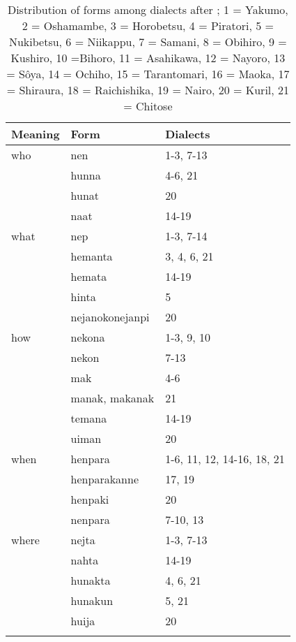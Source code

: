\begin{table}
\caption{Distribution of forms among dialects after \cite[64f.]{Asai1974}; 1 = Yakumo, 2 = Oshamambe, 3 = Horobetsu, 4 = Piratori, 5 = Nukibetsu, 6 = Niikappu, 7 = Samani, 8 = Obihiro, 9 = Kushiro, 10 =Bihoro, 11 = Asahikawa, 12 = Nayoro, 13 = Sôya, 14 = Ochiho, 15 = Tarantomari, 16 = Maoka, 17 = Shiraura, 18 = Raichishika, 19 = Nairo, 20 = Kuril, 21 = Chitose}
\label{tab:ainu:4}

\begin{tabularx}{\textwidth}{XXl}
\lsptoprule

\textbf{Meaning} & \textbf{Form} & \textbf{Dialects}\\
\midrule
who & nen & 1-3, 7-13\\
& hunna & 4-6, 21\\
& hunat & 20\\
& naat & 14-19\\
what & nep & 1-3, 7-14\\
& hemanta & 3, 4, 6, 21\\
& hemata & 14-19\\
& hinta & 5\\
& nejanokonejanpi & 20\\
how & nekona & 1-3, 9, 10\\
& nekon & 7-13\\
& mak & 4-6\\
& manak, makanak & 21\\
& temana & 14-19\\
& uiman & 20\\
when & henpara & 1-6, 11, 12, 14-16, 18, 21\\
& henparakanne & 17, 19\\
& henpaki & 20\\
& nenpara & 7-10, 13\\
where & nejta & 1-3, 7-13\\
& nahta & 14-19\\
& hunakta & 4, 6, 21\\
& hunakun & 5, 21\\
& huija & 20\\
\lspbottomrule
\end{tabularx}
\end{table}
\newpage 